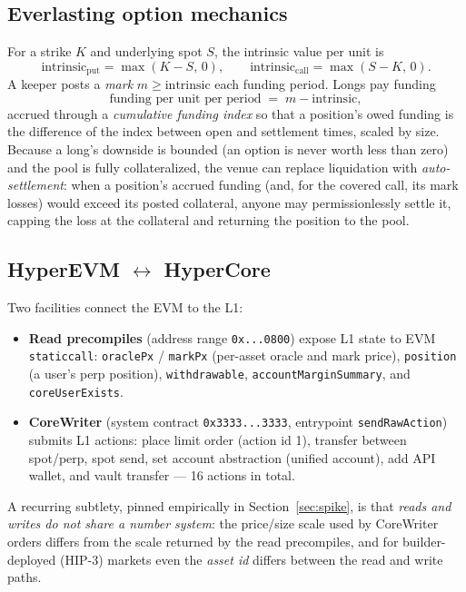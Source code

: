 \documentclass[11pt]{article}
\newcommand{\code}[1]{\texttt{\small #1}}
\begin{document}
\subsection{Everlasting option mechanics}

For a strike $K$ and underlying spot $S$, the intrinsic value per unit is
\[
\text{intrinsic}_{\text{put}} = \max(K-S,\,0), \qquad
\text{intrinsic}_{\text{call}} = \max(S-K,\,0).
\]
A keeper posts a \emph{mark} $m \geq \text{intrinsic}$ each funding period. Longs pay funding
\[
\text{funding per unit per period} \;=\; m - \text{intrinsic},
\]
accrued through a \emph{cumulative funding index} so that a position's owed funding is the difference
of the index between open and settlement times, scaled by size. Because a long's downside is bounded
(an option is never worth less than zero) and the pool is fully collateralized, the venue can replace
liquidation with \emph{auto-settlement}: when a position's accrued funding (and, for the covered call,
its mark losses) would exceed its posted collateral, anyone may permissionlessly settle it, capping
the loss at the collateral and returning the position to the pool.

\subsection{HyperEVM $\leftrightarrow$ HyperCore}

Two facilities connect the EVM to the L1:
\begin{itemize}[leftmargin=1.4em,itemsep=2pt]
  \item \textbf{Read precompiles} (address range \code{0x...0800}) expose L1 state to EVM
        \code{staticcall}: \code{oraclePx} / \code{markPx} (per-asset oracle and mark price),
        \code{position} (a user's perp position), \code{withdrawable}, \code{accountMarginSummary},
        and \code{coreUserExists}.
  \item \textbf{CoreWriter} (system contract \code{0x3333...3333}, entrypoint \code{sendRawAction})
        submits L1 actions: place limit order (action id 1), transfer between spot/perp, spot send,
        set account abstraction (unified account), add API wallet, and vault transfer --- 16 actions
        in total.
\end{itemize}
A recurring subtlety, pinned empirically in Section~\ref{sec:spike}, is that \emph{reads and writes
do not share a number system}: the price/size scale used by CoreWriter orders differs from the scale
returned by the read precompiles, and for builder-deployed (HIP-3) markets even the \emph{asset id}
differs between the read and write paths.
\end{document}
